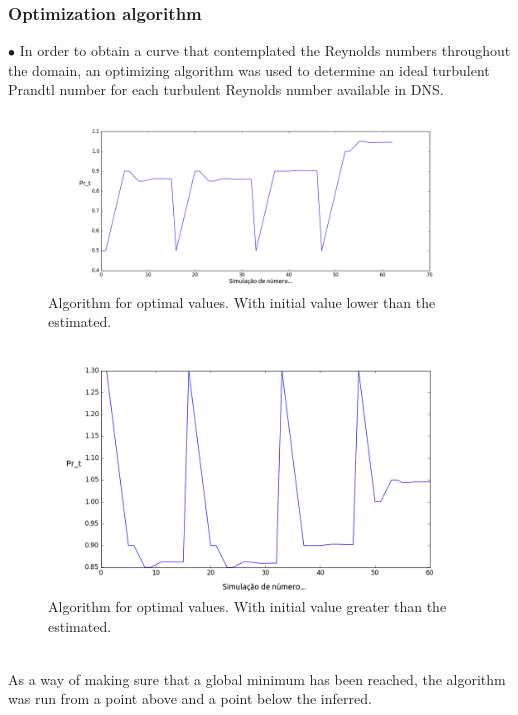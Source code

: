 \documentclass[xcolor=dvipsnames,8pt,aspectratio=34]{beamer}
\begin{document}
	
		\begin{frame}
		\frametitle{Optimization algorithm}
		$\bullet$ In order to obtain a curve that contemplated the Reynolds numbers throughout the domain, an optimizing algorithm was used to determine an ideal turbulent Prandtl number for each turbulent Reynolds number available in DNS.\\
		\begin{minipage}[h!]{0.5\textwidth}
			\begin{figure}
				\centering
				\includegraphics[angle=0, scale=0.18]{convergnciacima}
				\caption{Algorithm for optimal values. With initial value lower than the estimated.}
			\end{figure}
		\end{minipage}
		\begin{minipage}[h!]{0.45\textwidth}
			\begin{figure}
				\centering
				\includegraphics[angle=0, scale=0.22]{convergnciabaixo}
				\caption{Algorithm for optimal values. With initial value greater than the estimated.}
			\end{figure}
		\end{minipage}\\
	As a way of making sure that a global minimum has been reached, the algorithm was run from a point above and a point below the inferred.	
		\end{frame}
	
\end{document}
